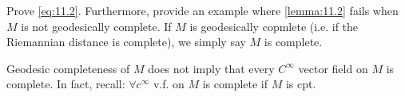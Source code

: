 \begin{problem}
    Prove \eqref{eq:11.2}. Furthermore, provide an example where \autoref{lemma:11.2} fails when $M$ is not geodesically complete.
    If $M$ is geodesically copmlete (i.e. if the Riemannian distance is complete),
    we simply say $M$ is complete.
\end{problem}

\begin{remark}[Remember]
    Geodesic completeness of $M$ does not imply that every $C^{\infty}$ vector field on $M$ is complete.
    In fact, recall: $\forall c^{\infty}$ v.f. on $M$ is complete if $M$ is cpt.
\end{remark}